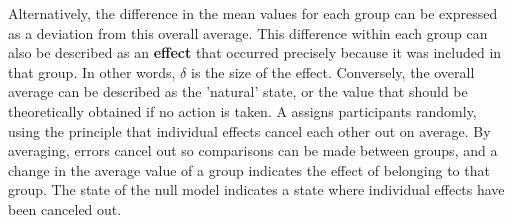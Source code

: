 \documentclass{ltjsbook}
\begin{document}
Alternatively, the difference in the mean values for each group can be expressed as a deviation from this overall average. This difference within each group can also be described as an \textbf{effect} that occurred precisely because it was included in that group. In other words, $\delta$ is the size of the effect. Conversely, the overall average can be described as the 'natural' state, or the value that should be theoretically obtained if no action is taken. A  assigns participants randomly, using the principle that individual effects cancel each other out on average. By averaging, errors cancel out so comparisons can be made between groups, and a change in the average value of a group indicates the effect of belonging to that group. The state of the null model indicates a state where individual effects have been canceled out.


\end{document}

